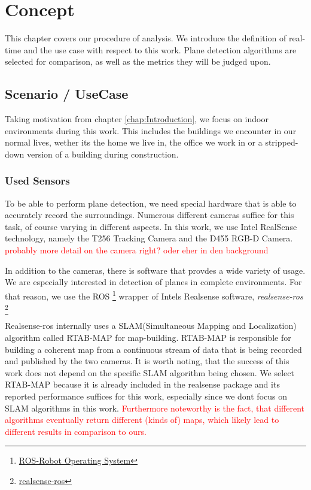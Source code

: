 \documentclass[main.tex]{subfiles}
\begin{document}
\chapter{Concept} \label{chap:Concept}


This chapter covers our procedure of analysis.
We introduce the definition of real-time and the use case with respect to this work.
Plane detection algorithms are selected for comparison, as well as the metrics they will be judged upon.

\section{Scenario / UseCase}
Taking motivation from chapter \ref{chap:Introduction}, we focus on indoor environments during this work.
This includes the buildings we encounter in our normal lives, wether its the home we live in, the office we work in or a stripped-down
version of a building during construction.


\subsection{Used Sensors}
To be able to perform plane detection, we need special hardware that is able to accurately record the surroundings.
Numerous different cameras suffice for this task, of course varying in different aspects.
In this work, we use Intel RealSense technology, namely the T256 Tracking Camera and the D455 RGB-D Camera.
\textcolor{red}{probably more detail on the camera right? oder eher in den background}


In addition to the cameras, there is software that provdes a wide variety of usage. We are especially interested in detection of planes
in complete environments. For that reason, we use the ROS \footnote{\href{https://www.ros.org/}{ROS-Robot Operating System}} wrapper of
Intels Realsense software, \textit{realsense-ros} \footnote{\href{https://github.com/IntelRealSense/realsense-ros}{realsense-ros}}

Realsense-ros internally uses a SLAM(Simultaneous Mapping and Localization) algorithm called RTAB-MAP \cite{Labbé_Michaud_2019} for map-building.
RTAB-MAP is responsible for building a coherent map from a continuous stream of data that is being recorded and published by the two cameras.
It is worth noting, that the success of this work does not depend on the specific SLAM algorithm being chosen. We select RTAB-MAP because
it is already included in the realsense package and its reported performance suffices for this work, especially since we dont focus on SLAM
algorithms in this work.
\textcolor{red} {Furthermore noteworthy is the fact, that different algorithms eventually return different (kinds of) maps, which likely lead to different results in
    comparison to ours.}
\end{document}
